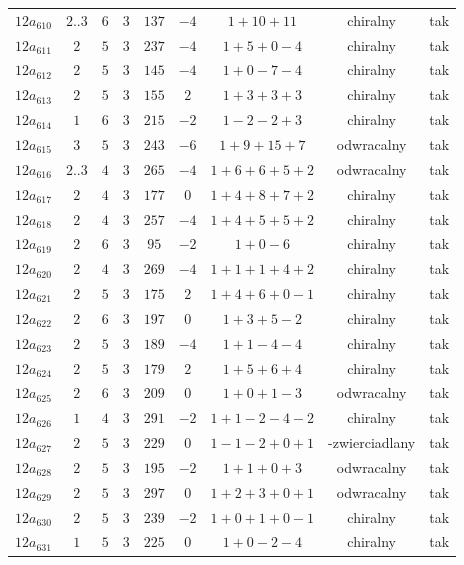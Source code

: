 \begin{longtable}{ccccccccc}
$12a_{610}$ & $2..3$ & $6$ & $3$ & $137$ & $-4$ & $1+10+11$ & chiralny & tak \\
$12a_{611}$ & $2$ & $5$ & $3$ & $237$ & $-4$ & $1+5+0-4$ & chiralny & tak \\
$12a_{612}$ & $2$ & $5$ & $3$ & $145$ & $-4$ & $1+0-7-4$ & chiralny & tak \\
$12a_{613}$ & $2$ & $5$ & $3$ & $155$ & $2$ & $1+3+3+3$ & chiralny & tak \\
$12a_{614}$ & $1$ & $6$ & $3$ & $215$ & $-2$ & $1-2-2+3$ & chiralny & tak \\
$12a_{615}$ & $3$ & $5$ & $3$ & $243$ & $-6$ & $1+9+15+7$ & odwracalny & tak \\
$12a_{616}$ & $2..3$ & $4$ & $3$ & $265$ & $-4$ & $1+6+6+5+2$ & odwracalny & tak \\
$12a_{617}$ & $2$ & $4$ & $3$ & $177$ & $0$ & $1+4+8+7+2$ & chiralny & tak \\
$12a_{618}$ & $2$ & $4$ & $3$ & $257$ & $-4$ & $1+4+5+5+2$ & chiralny & tak \\
$12a_{619}$ & $2$ & $6$ & $3$ & $95$ & $-2$ & $1+0-6$ & chiralny & tak \\
$12a_{620}$ & $2$ & $4$ & $3$ & $269$ & $-4$ & $1+1+1+4+2$ & chiralny & tak \\
$12a_{621}$ & $2$ & $5$ & $3$ & $175$ & $2$ & $1+4+6+0-1$ & chiralny & tak \\
$12a_{622}$ & $2$ & $6$ & $3$ & $197$ & $0$ & $1+3+5-2$ & chiralny & tak \\
$12a_{623}$ & $2$ & $5$ & $3$ & $189$ & $-4$ & $1+1-4-4$ & chiralny & tak \\
$12a_{624}$ & $2$ & $5$ & $3$ & $179$ & $2$ & $1+5+6+4$ & chiralny & tak \\
$12a_{625}$ & $2$ & $6$ & $3$ & $209$ & $0$ & $1+0+1-3$ & odwracalny & tak \\
$12a_{626}$ & $1$ & $4$ & $3$ & $291$ & $-2$ & $1+1-2-4-2$ & chiralny & tak \\
$12a_{627}$ & $2$ & $5$ & $3$ & $229$ & $0$ & $1-1-2+0+1$ & -zwierciadlany & tak \\
$12a_{628}$ & $2$ & $5$ & $3$ & $195$ & $-2$ & $1+1+0+3$ & odwracalny & tak \\
$12a_{629}$ & $2$ & $5$ & $3$ & $297$ & $0$ & $1+2+3+0+1$ & odwracalny & tak \\
$12a_{630}$ & $2$ & $5$ & $3$ & $239$ & $-2$ & $1+0+1+0-1$ & chiralny & tak \\
$12a_{631}$ & $1$ & $5$ & $3$ & $225$ & $0$ & $1+0-2-4$ & chiralny & tak \\

\end{longtable}
